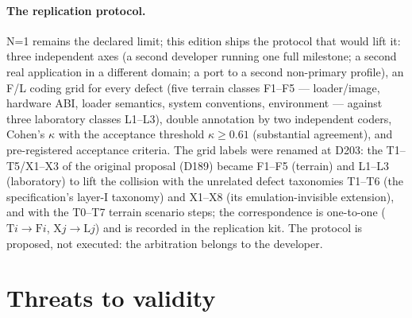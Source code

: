 \documentclass[11pt,a4paper]{article}
\begin{document}
\paragraph{The replication protocol.} N=1 remains the declared limit;
this edition ships the protocol that would lift it: three independent
axes (a second developer running one full milestone; a second real
application in a different domain; a port to a second non-primary
profile), an F/L coding grid for every defect (five terrain classes
F1--F5 --- loader/image, hardware ABI, loader semantics, system
conventions, environment --- against three laboratory classes L1--L3),
double
annotation by two independent coders, Cohen's $\kappa$ with the
acceptance threshold $\kappa \ge 0.61$ (substantial agreement), and
pre-registered acceptance criteria. The grid labels were renamed at
D203: the T1--T5/X1--X3 of the original proposal (D189) became
F1--F5 (terrain) and L1--L3 (laboratory) to lift the collision with
the unrelated defect taxonomies T1--T6 (the specification's layer-I
taxonomy) and X1--X8 (its emulation-invisible extension), and with the
T0--T7 terrain scenario steps; the correspondence is one-to-one
($\mathrm{T}i \to \mathrm{F}i$, $\mathrm{X}j \to \mathrm{L}j$) and
is recorded in the replication kit. The protocol is proposed, not
executed: the arbitration belongs to the developer.

\section{Threats to validity}\label{sec:threats}
\end{document}
